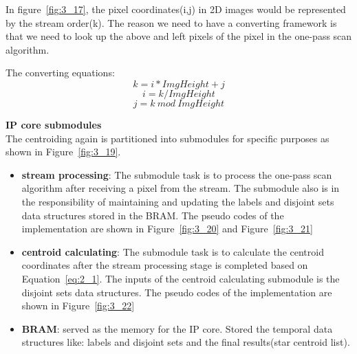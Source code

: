 
\noindent In figure~\ref{fig:3_17}, the pixel coordinates(i,j) in 2D images would be represented by the stream order(k). The reason we need to have a converting framework is that we need to look up the above and left pixels of the pixel in the one-pass scan algorithm. \\
	

\noindent The converting equations:
	$$k = i*ImgHeight + j$$
	$$i = k / ImgHeight$$
	$$j = k\ mod\ ImgHeight$$

\textbf{IP core submodules} \\

\noindent The centroiding again is partitioned into submodules for specific purposes as shown in Figure~\ref{fig:3_19}.


\begin{itemize}
	\item \textbf{stream processing}: The submodule task is to process the one-pass scan algorithm after receiving a pixel from the stream. The submodule also is in the responsibility of maintaining and updating the labels and disjoint sets data structures stored in the BRAM. The pseudo codes of the implementation are shown in Figure~\ref{fig:3_20} and Figure~\ref{fig:3_21}
	\item \textbf{centroid calculating}: The submodule task is to calculate the centroid coordinates after the stream processing stage is completed based on Equation~\ref{eq:2_1}. The inputs of the centroid calculating submodule is the disjoint sets data structures. The pseudo codes of the implementation are shown in Figure~\ref{fig:3_22}
	\item \textbf{BRAM}: served as the memory for the IP core. Stored the temporal data structures like: labels and disjoint sets and the final results(star centroid list).
\end{itemize}





